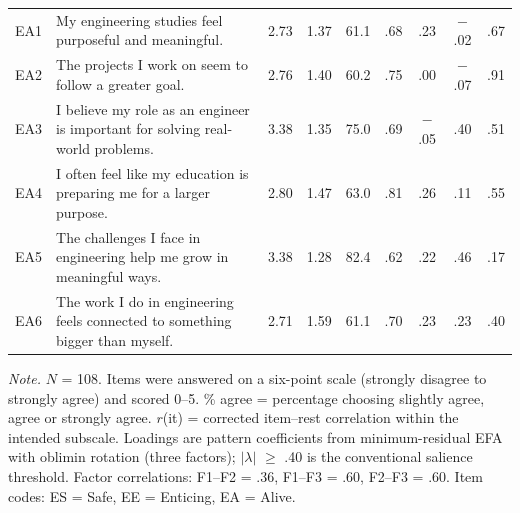 \documentclass[journal,a4paper]{IEEEtran}
\begin{document}
\begin{table}[!htbp]
\begin{tabular}{>{\raggedright\arraybackslash}p{0.75cm}>{\raggedright\arraybackslash}p{7.2cm}ccccccc}
EA1 & My engineering studies feel purposeful and meaningful. & 2.73 & 1.37 & 61.1 & .68 & .23 & $-$.02 & .67 \\
EA2 & The projects I work on seem to follow a greater goal. & 2.76 & 1.40 & 60.2 & .75 & .00 & $-$.07 & .91 \\
EA3 & I believe my role as an engineer is important for solving real-world problems. & 3.38 & 1.35 & 75.0 & .69 & $-$.05 & .40 & .51 \\
EA4 & I often feel like my education is preparing me for a larger purpose. & 2.80 & 1.47 & 63.0 & .81 & .26 & .11 & .55 \\
EA5 & The challenges I face in engineering help me grow in meaningful ways. & 3.38 & 1.28 & 82.4 & .62 & .22 & .46 & .17 \\
EA6 & The work I do in engineering feels connected to something bigger than myself. & 2.71 & 1.59 & 61.1 & .70 & .23 & .23 & .40 \\
\bottomrule
\end{tabular}

\vspace{3pt}\parbox{\textwidth}{\scriptsize \emph{Note.} $N$ = 108. Items were answered on a six-point scale (strongly disagree to strongly agree) and scored 0–5. \% agree = percentage choosing slightly agree, agree or strongly agree. $r$(it) = corrected item–rest correlation within the intended subscale. Loadings are pattern coefficients from minimum-residual EFA with oblimin rotation (three factors); $| \lambda |$ $\ge$ .40 is the conventional salience threshold. Factor correlations: F1–F2 = .36, F1–F3 = .60, F2–F3 = .60. Item codes: ES = Safe, EE = Enticing, EA = Alive.}
\end{table}
\end{document}
